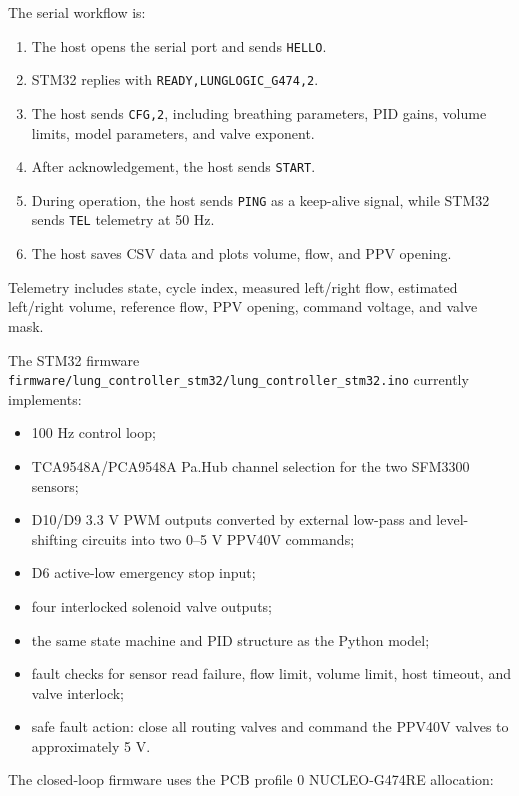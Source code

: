 \documentclass[11pt,a4paper]{article}
\begin{document}
The serial workflow is:

\begin{enumerate}
  \item The host opens the serial port and sends \texttt{HELLO}.
  \item STM32 replies with \texttt{READY,LUNGLOGIC\_G474,2}.
  \item The host sends \texttt{CFG,2}, including breathing parameters, PID gains, volume limits, model parameters, and valve exponent.
  \item After acknowledgement, the host sends \texttt{START}.
  \item During operation, the host sends \texttt{PING} as a keep-alive signal, while STM32 sends \texttt{TEL} telemetry at 50 Hz.
  \item The host saves CSV data and plots volume, flow, and PPV opening.
\end{enumerate}

Telemetry includes state, cycle index, measured left/right flow, estimated left/right volume, reference flow, PPV opening, command voltage, and valve mask.

The STM32 firmware \texttt{firmware/lung\_controller\_stm32/lung\_controller\_stm32.ino} currently implements:

\begin{itemize}
  \item 100 Hz control loop;
  \item TCA9548A/PCA9548A Pa.Hub channel selection for the two SFM3300 sensors;
  \item D10/D9 3.3 V PWM outputs converted by external low-pass and level-shifting circuits into two 0--5 V PPV40V commands;
  \item D6 active-low emergency stop input;
  \item four interlocked solenoid valve outputs;
  \item the same state machine and PID structure as the Python model;
  \item fault checks for sensor read failure, flow limit, volume limit, host timeout, and valve interlock;
  \item safe fault action: close all routing valves and command the PPV40V valves to approximately 5 V.
\end{itemize}

The closed-loop firmware uses the PCB profile 0 NUCLEO-G474RE allocation:
\end{document}
